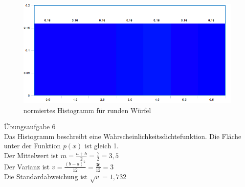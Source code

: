 \documentclass[fleqn,a4paper,12pt]{article}
\begin{document}
	\begin{figure}
		\includegraphics[width=1.0\textwidth]{H1.png}
		\caption{normiertes Histogramm f\"ur runden W\"urfel}
	\end{figure}
	\pagebreak
	Übungsaufgabe 6 \\
	Das Histogramm beschreibt eine Wahrscheinlichkeitsdichtefunktion. Die Fl\"ache unter der Funktion $p(x)$ ist gleich 1. \\
	Der Mittelwert ist $m = \frac{a+b}{2} = \frac{7}{2} = 3,5$ \\
	Der Varianz ist $v = \frac{(b-a)^2}{12} = \frac{36}{12} = 3 $ \\
	Die Standardabweichung ist $\sqrt{v} = 1,732$

	
\end{document}

